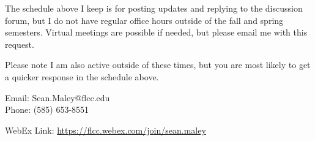 \documentclass[11pt]{article} %
\begin{document}
	\begin{center}
		
%		

	The schedule above I keep is for posting updates and replying to the discussion forum, but I do not have regular office hours outside of the fall and spring semesters.  Virtual meetings are possible if needed, but please email me with this request.
		
		Please note I am also active outside of these times, but you are most likely to get a quicker response in the schedule above.
		
		\bigskip
		
		 Email: Sean.Maley@flcc.edu\\
		 
		 Phone: (585) 653-8551
			
		 WebEx Link: \textcolor{blue}{\url{https://flcc.webex.com/join/sean.maley}}
			

			

		
		
%		
%		
%	
	\end{center}
	
	
	
\end{document}
